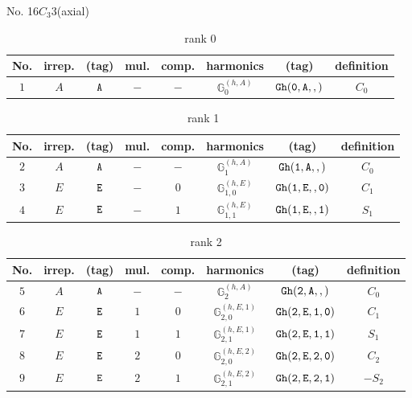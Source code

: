 \documentclass[fleqn,8pt]{jsarticle}
\begin{document}
\setcounter{MaxMatrixCols}{16}

\begin{center}
\LARGE
No. 16\quad$C_{3}$\quad$3$\quad[ trigonal ] (axial)
\end{center}
\begin{table}[ht!]
\begin{center}
\caption{rank 0}
\renewcommand{\arraystretch}{1.3}
\begin{tabular}{cccccccc} \hline \hline
No. & irrep. & (tag) & mul. & comp. & harmonics & (tag) & definition \\ \hline
$ 1 $ & $ A $ & $ {\tt A} $ & $ - $ & $ - $ & $ \mathbb{G}_{0}^{(h,A)} $ & $ {\tt Gh(0,A,,)} $ & $ C_{0} $ \\
 \hline \hline
\end{tabular}
\end{center}
\end{table}
\begin{table}[ht!]
\begin{center}
\caption{rank 1}
\renewcommand{\arraystretch}{1.3}
\begin{tabular}{cccccccc} \hline \hline
No. & irrep. & (tag) & mul. & comp. & harmonics & (tag) & definition \\ \hline
$ 2 $ & $ A $ & $ {\tt A} $ & $ - $ & $ - $ & $ \mathbb{G}_{1}^{(h,A)} $ & $ {\tt Gh(1,A,,)} $ & $ C_{0} $ \\
$ 3 $ & $ E $ & $ {\tt E} $ & $ - $ & $ 0 $ & $ \mathbb{G}_{1,0}^{(h,E)} $ & $ {\tt Gh(1,E,,0)} $ & $ C_{1} $ \\
$ 4 $ & $ E $ & $ {\tt E} $ & $ - $ & $ 1 $ & $ \mathbb{G}_{1,1}^{(h,E)} $ & $ {\tt Gh(1,E,,1)} $ & $ S_{1} $ \\
 \hline \hline
\end{tabular}
\end{center}
\end{table}
\begin{table}[ht!]
\begin{center}
\caption{rank 2}
\renewcommand{\arraystretch}{1.3}
\begin{tabular}{cccccccc} \hline \hline
No. & irrep. & (tag) & mul. & comp. & harmonics & (tag) & definition \\ \hline
$ 5 $ & $ A $ & $ {\tt A} $ & $ - $ & $ - $ & $ \mathbb{G}_{2}^{(h,A)} $ & $ {\tt Gh(2,A,,)} $ & $ C_{0} $ \\
$ 6 $ & $ E $ & $ {\tt E} $ & $ 1 $ & $ 0 $ & $ \mathbb{G}_{2,0}^{(h,E,1)} $ & $ {\tt Gh(2,E,1,0)} $ & $ C_{1} $ \\
$ 7 $ & $ E $ & $ {\tt E} $ & $ 1 $ & $ 1 $ & $ \mathbb{G}_{2,1}^{(h,E,1)} $ & $ {\tt Gh(2,E,1,1)} $ & $ S_{1} $ \\
$ 8 $ & $ E $ & $ {\tt E} $ & $ 2 $ & $ 0 $ & $ \mathbb{G}_{2,0}^{(h,E,2)} $ & $ {\tt Gh(2,E,2,0)} $ & $ C_{2} $ \\
$ 9 $ & $ E $ & $ {\tt E} $ & $ 2 $ & $ 1 $ & $ \mathbb{G}_{2,1}^{(h,E,2)} $ & $ {\tt Gh(2,E,2,1)} $ & $ - S_{2} $ \\
 \hline \hline
\end{tabular}
\end{center}
\end{table}
\end{document}
